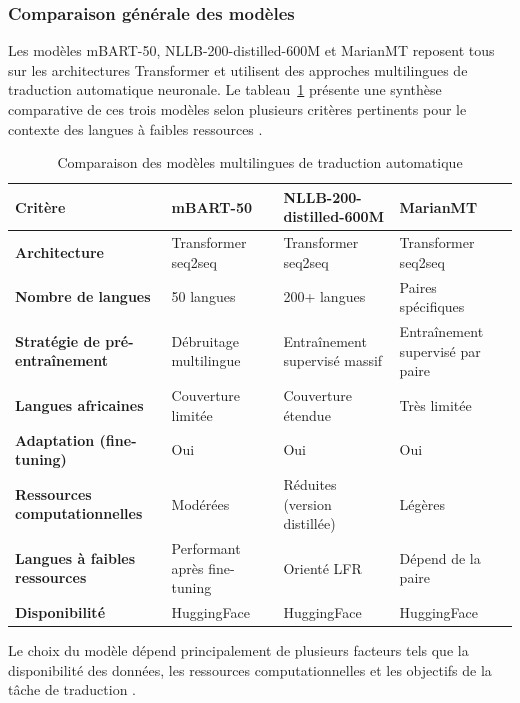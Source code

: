 \subsubsection{Comparaison générale des modèles}

Les modèles mBART-50, NLLB-200-distilled-600M et MarianMT reposent tous sur les architectures Transformer et utilisent des approches multilingues de traduction automatique neuronale. Le tableau~\ref{tab:comparaison_modeles} présente une synthèse comparative de ces trois modèles selon plusieurs critères pertinents pour le contexte des langues à faibles ressources \cite{rakhimov2024enhancing, ranathunga2023neural}.


\begin{table}[H]
\centering

\renewcommand{\arraystretch}{1.5}
\begin{tabular}{p{3.2cm}p{3.4cm}p{3.4cm}p{3.4cm}}
\toprule
\textbf{Critère} & \textbf{\ac{mBART}-50} & \textbf{\ac{NLLB}-200-distilled-600M} & \textbf{\ac{MarianMT}} \\
\midrule
\textbf{Architecture} & Transformer seq2seq & Transformer seq2seq & Transformer seq2seq \\
\textbf{Nombre de langues} & 50 langues & 200+ langues & Paires spécifiques \\
\textbf{Stratégie de pré-entraînement} & Débruitage multilingue & Entraînement supervisé massif & Entraînement supervisé par paire \\
\textbf{Langues africaines} & Couverture limitée & Couverture étendue & Très limitée \\
\textbf{Adaptation (fine-tuning)} & Oui & Oui & Oui \\
\textbf{Ressources computationnelles} & Modérées & Réduites (version distillée) & Légères \\
\textbf{Langues à faibles ressources} & Performant après fine-tuning & Orienté LFR & Dépend de la paire \\
\textbf{Disponibilité} & HuggingFace & HuggingFace & HuggingFace \\
\bottomrule
\end{tabular}
\caption{Comparaison des modèles multilingues de traduction automatique}
\label{tab:comparaison_modeles}
\end{table}

Le choix du modèle dépend principalement de plusieurs facteurs tels que la disponibilité des données, les ressources computationnelles et les objectifs de la tâche de traduction \cite{ranathunga2023neural}.

